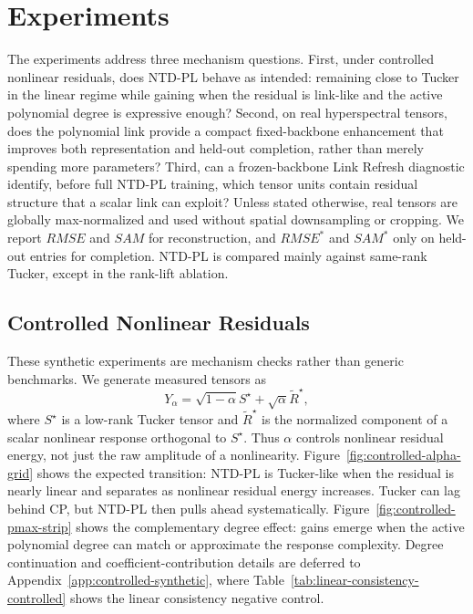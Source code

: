 \section{Experiments}
\label{sec:experiments}

The experiments address three mechanism questions. First, under controlled nonlinear residuals,
does NTD-PL behave as intended: remaining close to Tucker in the linear regime while gaining
when the residual is link-like and the active polynomial degree is expressive enough? Second,
on real hyperspectral tensors, does the polynomial link provide a compact fixed-backbone
enhancement that improves both representation and held-out completion, rather than merely
spending more parameters? Third, can a frozen-backbone Link Refresh diagnostic identify, before
full NTD-PL training, which tensor units contain residual structure that a scalar link can exploit?
Unless stated otherwise, real tensors are globally max-normalized and used without spatial
downsampling or cropping. We report $RMSE$ and $SAM$ for reconstruction, and $RMSE^*$ and
$SAM^*$ only on held-out entries for completion. NTD-PL is compared mainly against same-rank
Tucker, except in the rank-lift ablation.

\subsection{Controlled Nonlinear Residuals}
\label{subsec:controlled-experiments}

These synthetic experiments are mechanism checks rather than generic
benchmarks. We generate measured tensors as
\[
Y_\alpha=\sqrt{1-\alpha}S^\star+\sqrt{\alpha}\widetilde{R}^\star,
\]
where \(S^\star\) is a low-rank Tucker tensor and \(\widetilde{R}^\star\) is
the normalized component of a scalar nonlinear response orthogonal to
\(S^\star\). Thus \(\alpha\) controls nonlinear residual energy, not just the
raw amplitude of a nonlinearity. Figure~\ref{fig:controlled-alpha-grid} shows
the expected transition: NTD-PL is Tucker-like when the residual is nearly
linear and separates as nonlinear residual energy increases. Tucker can lag
behind CP, but NTD-PL then pulls ahead systematically.
Figure~\ref{fig:controlled-pmax-strip} shows the complementary degree effect:
gains emerge when the active polynomial degree can match or approximate the
response complexity. Degree continuation and coefficient-contribution details
are deferred to Appendix~\ref{app:controlled-synthetic}, where Table~\ref{tab:linear-consistency-controlled} shows the linear consistency negative control.

